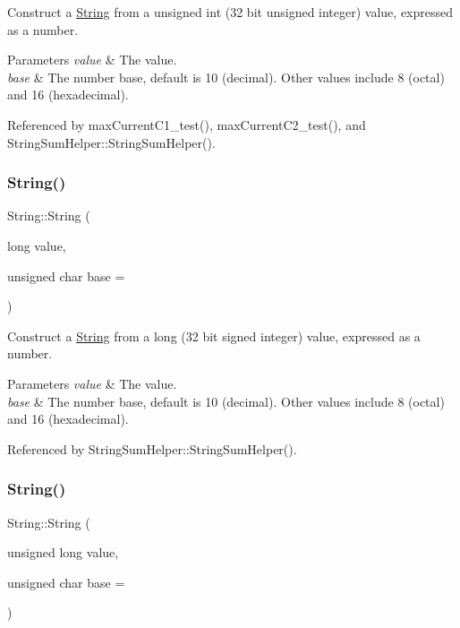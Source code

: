 Construct a \hyperlink{class_string}{String} from a unsigned int (32 bit unsigned integer) value, expressed as a number. 


\begin{DoxyParams}{Parameters}
{\em value} & The value.\\
\hline
{\em base} & The number base, default is 10 (decimal). Other values include 8 (octal) and 16 (hexadecimal). \\
\hline
\end{DoxyParams}


Referenced by max\+Current\+C1\+\_\+test(), max\+Current\+C2\+\_\+test(), and String\+Sum\+Helper\+::\+String\+Sum\+Helper().

\mbox{\label{class_string_a868687056546919b7109c0801d75ec83}} 
\subsubsection{\texorpdfstring{String()}{String()}\hspace{0.1cm}{\footnotesize\ttfamily [10/13]}}
{\footnotesize\ttfamily String\+::\+String (\begin{DoxyParamCaption}\item[{long}]{value,  }\item[{unsigned char}]{base = {} }\end{DoxyParamCaption})\hspace{0.3cm}{\ttfamily [explicit]}}



Construct a \hyperlink{class_string}{String} from a long (32 bit signed integer) value, expressed as a number. 


\begin{DoxyParams}{Parameters}
{\em value} & The value.\\
\hline
{\em base} & The number base, default is 10 (decimal). Other values include 8 (octal) and 16 (hexadecimal). \\
\hline
\end{DoxyParams}


Referenced by String\+Sum\+Helper\+::\+String\+Sum\+Helper().

\mbox{\label{class_string_abdad234c756b44cce55c75db24fddecf}} 
\subsubsection{\texorpdfstring{String()}{String()}\hspace{0.1cm}{\footnotesize\ttfamily [11/13]}}
{\footnotesize\ttfamily String\+::\+String (\begin{DoxyParamCaption}\item[{unsigned long}]{value,  }\item[{unsigned char}]{base = {} }\end{DoxyParamCaption})\hspace{0.3cm}{\ttfamily [explicit]}}



